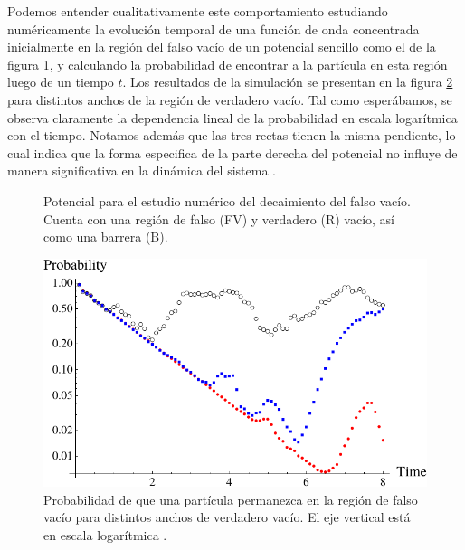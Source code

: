 Podemos entender cualitativamente este comportamiento estudiando numéricamente la evolución temporal de una función de onda concentrada inicialmente en la región del falso vacío de un potencial sencillo como el de la figura \ref{fig:potencial_numerico}, y calculando la probabilidad de encontrar a la partícula en esta región luego de un tiempo $t$. Los resultados de la simulación se presentan en la figura \ref{fig:numerico} para distintos anchos de la región de verdadero vacío. Tal como esperábamos, se observa claramente la dependencia lineal de la probabilidad en escala logarítmica con el tiempo. Notamos además que las tres rectas tienen la misma pendiente, lo cual indica que la forma especifica de la parte derecha del potencial no influye de manera significativa en la dinámica del sistema \cite{paranjape2017theory}. 

\begin{figure}[h]
	\centering
	\caption{Potencial para el estudio numérico del decaimiento del falso vacío. Cuenta con una región de falso (FV) y verdadero (R) vacío, así como una barrera (B).}
	\label{fig:potencial_numerico}
\end{figure}

\begin{figure}[h]
	\centering
	\includegraphics[scale = 0.35]{FIGURAS/numerico_masoumi}
	\caption{Probabilidad de que una partícula permanezca en la región de falso vacío para distintos anchos de verdadero vacío. El eje vertical está en escala logarítmica \cite{Masoumi:2015psa}.}
	\label{fig:numerico}
\end{figure}


